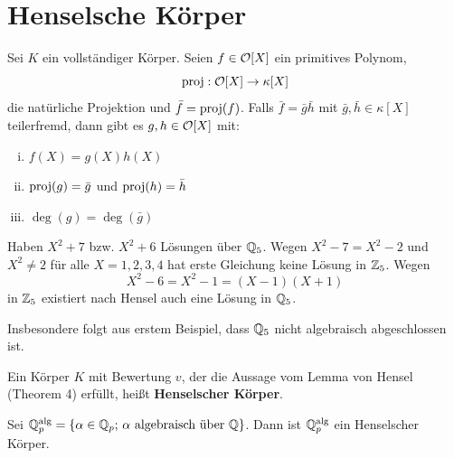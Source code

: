 
\section{Henselsche Körper}

\begin{erinnerung*}
	Sei $K$ ein vollständiger Körper. Seien $f \in \mathcal{O}[X]$ ein primitives Polynom,
	\[\operatorname{proj}: \mathcal{O}[X] \to \kappa[X]\]
	die natürliche Projektion und $\bar{f}=\operatorname{proj}(f)$. Falls $\bar{f}=\bar{g}\bar{h}$ mit $\bar{g}, \bar{h} \in \kappa[X]$ teilerfremd, dann gibt es $g,h \in \mathcal{O}[X]$ mit:
	\begin{enumerate}[(i)]
		\item $f(X)=g(X)h(X)$
		\item $\operatorname{proj}(g)=\bar{g}$ und $\operatorname{proj}(h)=\bar{h}$
		\item $\deg(g)=\deg(\bar{g})$
	\end{enumerate}
\end{erinnerung*}

\begin{Bsp*}
	Haben $X^2+7$ bzw. $X^2+6$ Lösungen über $\mathbb{Q}_5$. Wegen $X^2 -7 = X^2 -2$ und $X^2 \neq 2$ für alle $X=1,2,3,4$ hat erste Gleichung keine Lösung in $\mathbb{Z}_5$.
	Wegen
	\[ X^2-6 =X^2-1=(X-1)(X+1)
	\]
	in $\mathbb{Z}_5$ existiert nach Hensel auch eine Lösung in $\mathbb{Q}_5$.
	
	Insbesondere folgt aus erstem Beispiel, dass $\mathbb{Q}_5$ nicht algebraisch abgeschlossen ist.
\end{Bsp*}


\begin{defi}
	Ein Körper $K$ mit Bewertung $v$, der die Aussage vom Lemma von Hensel (Theorem 4) erfüllt, heißt \textbf{Henselscher Körper}.
\end{defi}

\begin{Bsp}
	Sei $\mathbb{Q}_p^{\operatorname{alg}} = \{ \alpha \in \mathbb{Q}_p; \, \alpha \text{ algebraisch über } \mathbb{Q}  \}$.
	Dann ist $\mathbb{Q}_p^{\operatorname{alg}}$ ein Henselscher Körper.
\end{Bsp}

